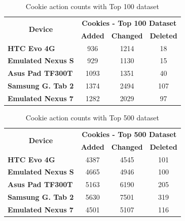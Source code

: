 \documentclass{acm_proc_article-sp}
\begin{document}
\begin{table}[htbp]
  \centering
  \caption{Cookie action counts with Top 100 dataset}
    \begin{tabular}{|c|c|c|c|}
    \hline
    \multicolumn{1}{|c|}{\multirow{2}[4]{*}{\textbf{Device}}} & \multicolumn{3}{|c|}{\textbf{Cookies - Top 100 Dataset}} \\ \cline{2-4}
    \multicolumn{1}{|c|}{} & \multicolumn{1}{|c|}{\textbf{Added}} & \multicolumn{1}{|c|}{\textbf{Changed}} & \multicolumn{1}{|c|}{\textbf{Deleted}} \\ \hline
    \multicolumn{1}{|l|}{\textbf{HTC Evo 4G}} & 936   & 1214  & 18 \\
    \multicolumn{1}{|l|}{\textbf{Emulated Nexus S}} & 929   & 1130  & 15 \\
    \multicolumn{1}{|l|}{\textbf{Asus Pad TF300T}} & 1093  & 1351  & 40 \\
    \multicolumn{1}{|l|}{\textbf{Samsung G. Tab 2}} & 1374  & 2494  & 107 \\
    \multicolumn{1}{|l|}{\textbf{Emulated Nexus 7}} & 1282  & 2029  & 97 \\ \hline
    \end{tabular}%
  \label{tab:cookie_counts_100}%
\end{table}%

\begin{table}[htbp]
  \centering
  \caption{Cookie action counts with Top 500 dataset}
    \begin{tabular}{|c|c|c|c|}
    \hline
    \multicolumn{1}{|c|}{\multirow{2}[4]{*}{\textbf{Device}}} & \multicolumn{3}{|c|}{\textbf{Cookies - Top 500 Dataset}} \\ \cline{2-4}
    \multicolumn{1}{|c|}{} & \multicolumn{1}{|c|}{\textbf{Added}} & \multicolumn{1}{|c|}{\textbf{Changed}} & \multicolumn{1}{|c|}{\textbf{Deleted}} \\ \hline
    \multicolumn{1}{|l|}{\textbf{HTC Evo 4G}} & 4387  & 4545  & 101 \\
    \multicolumn{1}{|l|}{\textbf{Emulated Nexus S}} & 4665  & 4946  & 100 \\
    \multicolumn{1}{|l|}{\textbf{Asus Pad TF300T}} & 5163  & 6190  & 205 \\
    \multicolumn{1}{|l|}{\textbf{Samsung G. Tab 2}} & 5630  & 7501  & 319 \\
    \multicolumn{1}{|l|}{\textbf{Emulated Nexus 7}} & 4501  & 5107  & 116 \\ \hline
    \end{tabular}%
  \label{tab:cookie_counts_500}%
\end{table}%
\end{document}
